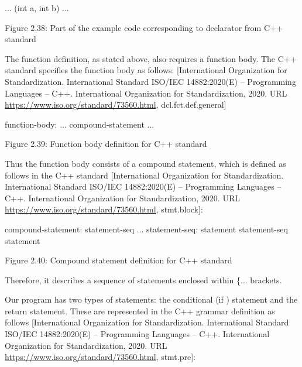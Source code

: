 \begin{cpp}
... (int a, int b)
...
\end{cpp}

\begin{center}
Figure 2.38: Part of the example code corresponding to declarator from C++ standard
\end{center}

The function definition, as stated above, also requires a function body. The C++ standard specifies the function body as follows: [International Organization for Standardization. International Standard ISO/IEC 14882:2020(E) – Programming Languages – C++. International Organization for Standardization, 2020. URL \url{https://www.iso.org/standard/73560.html}, dcl.fct.def.general]

\begin{shell}
function-body:
    ... compound-statement
    ...
\end{shell}

\begin{center}
Figure 2.39: Function body definition for C++ standard
\end{center}

Thus the function body consists of a compound statement, which is defined as follows in the C++ standard [International Organization for Standardization. International Standard ISO/IEC 14882:2020(E) – Programming Languages – C++. International Organization for Standardization, 2020. URL \url{https://www.iso.org/standard/73560.html}, stmt.block]:

\begin{shell}
compound-statement:
    { statement-seq ... }
statement-seq:
    statement
    statement-seq statement
\end{shell}

\begin{center}
Figure 2.40: Compound statement definition for C++ standard
\end{center}

Therefore, it describes a sequence of statements enclosed within \{... brackets.

Our program has two types of statements: the conditional (if ) statement and the return statement. These are represented in the C++ grammar definition as follows [International Organization for Standardization. International Standard ISO/IEC 14882:2020(E) – Programming Languages – C++. International Organization for Standardization, 2020. URL \url{https://www.iso.org/standard/73560.html}, stmt.pre]:

